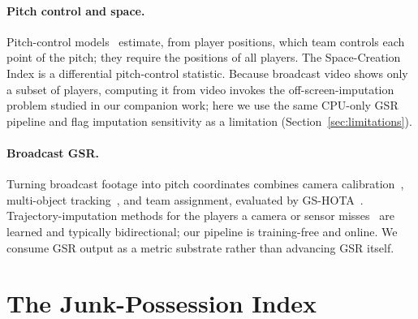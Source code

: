 \documentclass[11pt]{article}
\begin{document}
\paragraph{Pitch control and space.} Pitch-control
models~\citep{spearman2017physics,spearman2018beyond} estimate, from player
positions, which team controls each point of the pitch; they require the
positions of all players. The Space-Creation Index is a differential
pitch-control statistic. Because broadcast video shows only a subset of
players, computing it from video invokes the off-screen-imputation problem
studied in our companion work; here we use the same CPU-only GSR pipeline and
flag imputation sensitivity as a limitation (Section~\ref{sec:limitations}).

\paragraph{Broadcast GSR.} Turning broadcast footage into pitch coordinates
combines camera calibration~\citep{gutierrez2024pnlcalib,falaleev2024keypoints},
multi-object tracking~\citep{aharon2022botsort}, and team assignment, evaluated
by GS-HOTA~\citep{somers2024soccernet}. Trajectory-imputation methods for the
players a camera or sensor misses~\citep{omidshafiei2022,everett2023inferring,
capellera2024transportmer} are learned and typically bidirectional; our
pipeline is training-free and online. We consume GSR output as a metric
substrate rather than advancing GSR itself.

\section{The Junk-Possession Index}
\label{sec:index}
\end{document}
